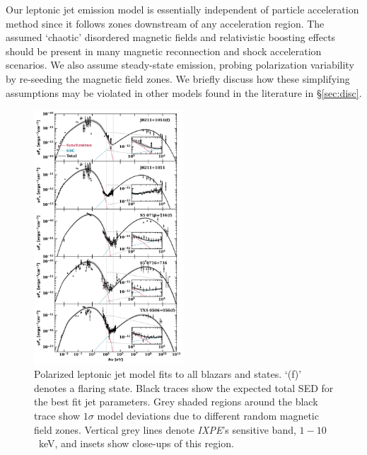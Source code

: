 Our leptonic jet emission model is essentially independent of particle acceleration method since it follows zones downstream of any acceleration region. The assumed `chaotic' disordered magnetic fields and relativistic boosting effects should be present in many magnetic reconnection and shock acceleration scenarios. We also assume steady-state emission, probing polarization variability by re-seeding the magnetic field zones. We briefly discuss how these simplifying assumptions may be violated in other models found in the literature in \S\ref{sec:disc}.

\begin{figure}
\centering
\includegraphics[width=0.5\textwidth]{figures/SED_all.pdf}
\caption{Polarized leptonic jet model fits to all blazars and states. `(f)' denotes a flaring state. Black traces show the expected total SED for the best fit jet parameters. Grey shaded regions around the black trace show $1\sigma$ model deviations due to different random magnetic field zones. Vertical grey lines denote {\it IXPE}'s sensitive band, $1-10$~keV, and insets show close-ups of this region.}
\label{fig:sed}
\end{figure}

